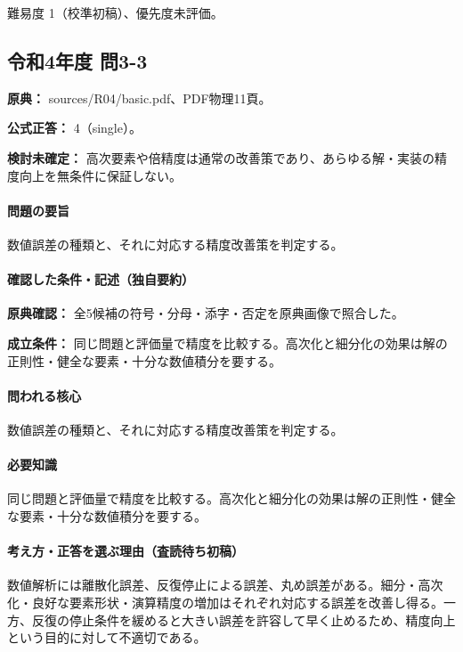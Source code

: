 \par 難易度 1（校準初稿）、優先度未評価。

\subsection{令和4年度 問3-3}
\label{q:r04-reg-basic-3-3}

\noindent\textbf{原典：} sources/R04/basic.pdf、PDF物理11頁。

\textbf{公式正答：} 4（single）。

\par\textbf{検討未確定：} 高次要素や倍精度は通常の改善策であり、あらゆる解・実装の精度向上を無条件に保証しない。

\paragraph{問題の要旨} 数値誤差の種類と、それに対応する精度改善策を判定する。

\paragraph{確認した条件・記述（独自要約）}\mbox{}\par

\noindent\textbf{原典確認：} 全5候補の符号・分母・添字・否定を原典画像で照合した。\par

\noindent\textbf{成立条件：} 同じ問題と評価量で精度を比較する。高次化と細分化の効果は解の正則性・健全な要素・十分な数値積分を要する。\par

\paragraph{問われる核心} 数値誤差の種類と、それに対応する精度改善策を判定する。

\paragraph{必要知識} 同じ問題と評価量で精度を比較する。高次化と細分化の効果は解の正則性・健全な要素・十分な数値積分を要する。

\paragraph{考え方・正答を選ぶ理由（査読待ち初稿）} 数値解析には離散化誤差、反復停止による誤差、丸め誤差がある。細分・高次化・良好な要素形状・演算精度の増加はそれぞれ対応する誤差を改善し得る。一方、反復の停止条件を緩めると大きい誤差を許容して早く止めるため、精度向上という目的に対して不適切である。

